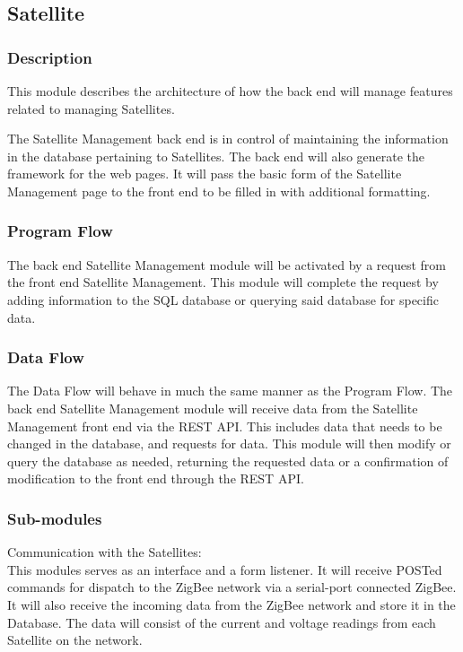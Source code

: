 
\subsection{Satellite}

\subsubsection{Description}

This module describes the architecture of how the back end will manage features related to managing Satellites. 

The Satellite Management back end is in control of maintaining the information in the database pertaining to Satellites. 
The back end will also generate the framework for the web pages. 
It will pass the basic form of the Satellite Management page to the front end to be filled in with additional formatting. 

\subsubsection{Program Flow}

The back end Satellite Management module will be activated by a request from the front end Satellite Management. 
This module will complete the request by adding information to the SQL database or querying said database for specific data. 

\subsubsection{Data Flow}

The Data Flow will behave in much the same manner as the Program Flow. 
The back end Satellite Management module will receive data from the Satellite Management front end via the REST API. 
This includes data that needs to be changed in the database, and requests for data. 
This module will then modify or query the database as needed, 
returning the requested data or a confirmation of modification to the front end through the REST API. 

\subsubsection{Sub-modules}
Communication with the Satellites:\\
This modules serves as an interface and a form listener. 
It will receive POSTed commands for dispatch to the ZigBee network via a serial-port connected ZigBee. 
It will also receive the incoming data from the ZigBee network and store it in the Database. 
The data will consist of the current and voltage readings from each Satellite on the network. 
